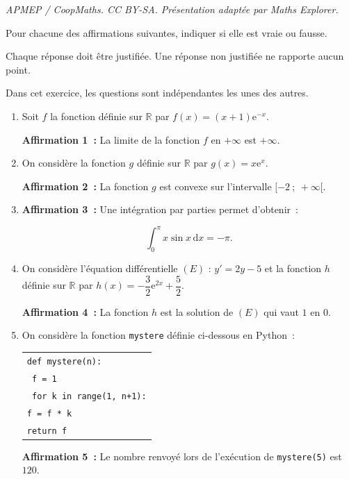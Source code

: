 \documentclass[10pt]{article}
\providecommand{\R}{\mathbb{R}}
\providecommand{\e}{{\mathrm{e}}}
\begin{document}
\noindent\textit{APMEP / CoopMaths. CC BY-SA. Présentation adaptée par Maths Explorer.}\par\medskip
Pour chacune des affirmations suivantes, indiquer si elle est vraie ou fausse.

Chaque réponse doit être justifiée. Une réponse non justifiée ne rapporte aucun point.

Dans cet exercice, les questions sont indépendantes les unes des autres.

\begin{enumerate}
\item Soit $f$ la fonction définie sur $\R$ par $f(x) = (x + 1)\e^{-x}$.

\textbf{Affirmation 1~:} La limite de la fonction $f$ en $+\infty$ est $+\infty$.

\item On considère la fonction $g$ définie sur $\R$ par $g(x) = x\e^x$.

\textbf{Affirmation 2~:} La fonction $g$ est convexe sur l'intervalle $[-2~;~+\infty[$.

\item \textbf{Affirmation 3~:} Une intégration par parties permet d'obtenir~:

\[\displaystyle\int_{0}^{\pi} x\sin x\,\text{d}x = -\pi.\]

\item On considère l'équation différentielle $(E)$ : $y' = 2y - 5$ et la fonction $h$ définie sur $\R$ par $h(x) = -\dfrac{3}{2}\e^{2x} + \dfrac{5}{2}$.

\textbf{Affirmation 4~:} La fonction $h$ est la solution de $(E)$ qui vaut $1$ en $0$.

\item On considère la fonction \texttt{mystere} définie ci-dessous en Python~:

\begin{center}












\begin{tabular}{|l|}\hline
\texttt{def mystere(n):}\\
\quad \texttt{ f = 1}\\
\quad \texttt{ for k in range(1, n+1):}\\
\quad \quad \texttt{f = f * k}\\
\quad  \texttt{return f}\\ \hline
\end{tabular}

\end{center}

\textbf{Affirmation 5~:} Le nombre renvoyé lors de l'exécution de \texttt{mystere(5)} est $120$.
\end{enumerate}
\end{document}
